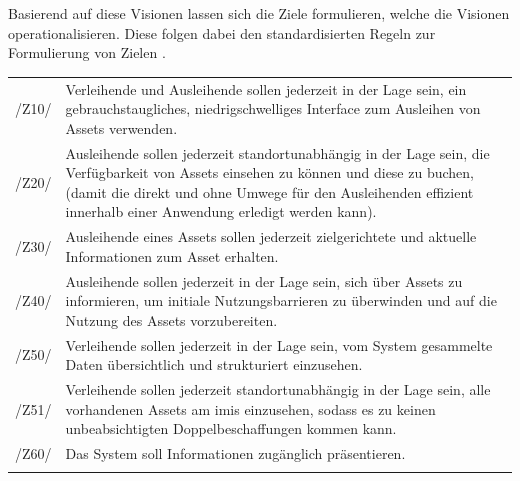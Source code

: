 Basierend auf diese Visionen lassen sich die Ziele formulieren, welche die Visionen
operationalisieren. Diese folgen dabei den standardisierten Regeln zur Formulierung von Zielen
\cite{pohl_requirements_2008}.

\begin{center}
        \renewcommand{\arraystretch}{1.5}
        \begin{longtable}{lp{}} \arrayrulecolor{maincolor}\hline
                \sffamily\color{maincolor}/Z10/ & Verleihende und Ausleihende sollen jederzeit in
                der Lage sein, ein gebrauchstaugliches, niedrigschwelliges Interface zum Ausleihen
                von Assets verwenden.                                                                \\
                \sffamily\color{maincolor}/Z20/ & Ausleihende sollen jederzeit standortunabhängig in
                der Lage sein, die Verfügbarkeit von Assets einsehen zu können und diese zu buchen,
                (damit die direkt und ohne Umwege für den Ausleihenden effizient innerhalb einer
                Anwendung erledigt werden kann).                                                     \\
                \sffamily\color{maincolor}/Z30/ & Ausleihende eines Assets sollen jederzeit
                zielgerichtete und aktuelle Informationen zum Asset erhalten.                        \\
                \sffamily\color{maincolor}/Z40/ & Ausleihende sollen jederzeit in der Lage sein,
                sich über Assets zu informieren, um initiale Nutzungsbarrieren zu überwinden und auf
                die Nutzung des Assets vorzubereiten.                                                \\
                \sffamily\color{maincolor}/Z50/ & Verleihende sollen jederzeit in der Lage sein, vom
                System gesammelte Daten übersichtlich und strukturiert einzusehen.                   \\
                \sffamily\color{maincolor}/Z51/ & Verleihende sollen jederzeit standortunabhängig in
                der Lage sein, alle vorhandenen Assets am \ac{imis} einzusehen, sodass es zu keinen
                unbeabsichtigten Doppelbeschaffungen kommen kann.                                    \\
                \sffamily\color{maincolor}/Z60/ & Das System soll Informationen zugänglich
                präsentieren.                                                                        \\
                \arrayrulecolor{maincolor}\hline
        \end{longtable}
\end{center}
\vspace*{-1.5cm}

